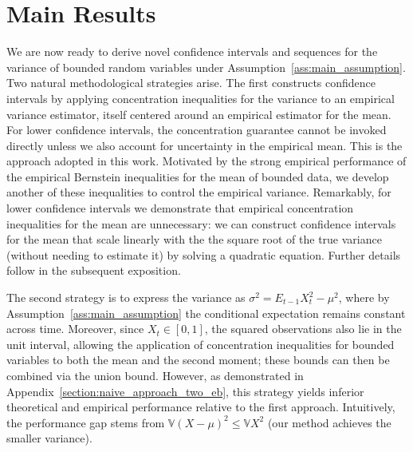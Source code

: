 
\section{Main Results} \label{section:main_results}
We are now ready to derive novel confidence intervals and sequences for the variance of bounded random variables under Assumption~\ref{ass:main_assumption}. Two natural methodological strategies arise. The first constructs confidence intervals by applying concentration inequalities for the variance to an empirical variance estimator, itself centered around an empirical estimator for the mean. For lower confidence intervals, the concentration guarantee cannot be invoked directly unless we also account for uncertainty in the empirical mean. This is the approach adopted in this work. Motivated by the strong empirical performance of the empirical Bernstein inequalities for the mean of bounded data, we develop another of these inequalities to control the empirical variance. Remarkably, for lower confidence intervals we demonstrate that empirical concentration inequalities for the mean are unnecessary: we can construct confidence intervals for the mean that scale linearly with the the square root of the true variance (without needing to estimate it) by solving a quadratic equation. Further details follow in the subsequent exposition. 
 
The second strategy is to express the variance as $\sigma^2 = E_{t-1} X_t^2 - \mu^2$, where by Assumption~\ref{ass:main_assumption} the conditional expectation remains constant across time. Moreover, since $X_t \in [0,1]$, the squared observations also lie in the unit interval, allowing the application of concentration inequalities for bounded variables to both the mean and the second moment; these bounds can then be combined via the union bound. However, as demonstrated in Appendix~\ref{section:naive_approach_two_eb}, this strategy yields inferior theoretical and empirical performance relative to the first approach. Intuitively, the performance gap stems from $\mathbb{V} (X-\mu)^2 \leq \mathbb{V} X^2$ (our method achieves the smaller variance).




